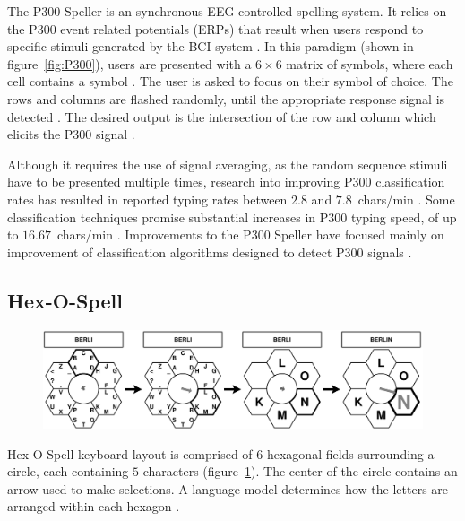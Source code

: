 \documentclass[12pt,titlepage]{article}
\begin{document}
The P300 Speller is an synchronous EEG controlled spelling system.   It relies on the P300 event 
related potentials (ERPs) that result when users respond to specific stimuli generated by the BCI 
system \cite{sellers_p300-based_2006}.  In this paradigm (shown in figure~\ref{fig:P300}), users are presented with a $6\times6$ matrix of symbols, where 
each cell contains a symbol \cite{sellers_p300-based_2006}.  The user is asked to focus on their symbol of choice.  The rows and 
columns are flashed randomly, until the appropriate response signal is detected \cite{sellers_p300-based_2006}.  The desired output
is the intersection of the row and column which elicits the P300 signal \cite{sellers_p300-based_2006}.

Although it requires the use of signal averaging, as the random sequence stimuli have to be presented 
multiple times, research into improving P300 classification rates has resulted in reported typing rates 
between $2.8$ and $7.8$~chars/min \cite{sellers_braincomputer_2004}.  Some classification techniques promise substantial increases in 
P300 typing speed, of up to $16.67$~chars/min \cite{wolpaw_braincomputer_2002}.  Improvements to the P300 Speller have focused mainly on improvement of classification algorithms designed to detect P300 signals \cite{krusienski2006comparison} \cite{wolpaw_braincomputer_2002} \cite{sellers_braincomputer_2004}.

\subsection{Hex-O-Spell}

\begin{figure}[t]
\begin{center}
	\includegraphics[scale=0.10]{figure3.jpeg}
	\label{fig:Hex}
\end{center}
\end{figure}

Hex-O-Spell keyboard layout is comprised of $6$ hexagonal fields surrounding a circle, each containing 
$5$ characters (figure~\ref{fig:Hex}).  The center of the circle contains an arrow used to make selections.  A language 
model determines how the letters are arranged within each hexagon \cite{blankertz_berlin_2006}.
\end{document}

